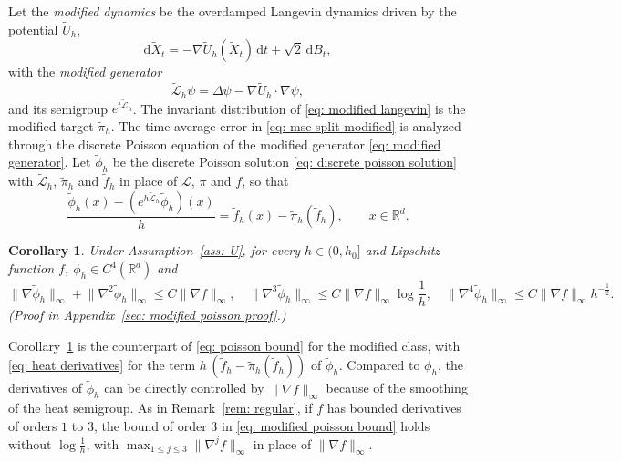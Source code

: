 \documentclass{article}
\newtheorem{corollary}{Corollary}
\newcommand{\Le}{\leqslant}
\newcommand{\D}{\mathrm{d}}
\newcommand{\norm}[1]{\lVert #1 \rVert}
\numberwithin{equation}{section}
\begin{document}
Let the \emph{modified dynamics} be the overdamped Langevin dynamics driven by the potential $\tilde U_h$,
\begin{equation}
    \D \tilde X_t = -\nabla \tilde U_h(\tilde X_t)\,\D t + \sqrt2\,\D B_t ,
    \label{eq: modified langevin}
\end{equation}
with the \emph{modified generator}
\begin{equation}
    \tilde{\mathcal L}_h \psi = \Delta \psi - \nabla \tilde U_h \cdot \nabla \psi ,
    \label{eq: modified generator}
\end{equation}
and its semigroup $e^{t\tilde{\mathcal L}_h}$. The invariant distribution of \eqref{eq: modified langevin} is the modified target $\tilde\pi_h$. The time average error in \eqref{eq: mse split modified} is analyzed through the discrete Poisson equation of the modified generator \eqref{eq: modified generator}. Let $\tilde\phi_h$ be the discrete Poisson solution \eqref{eq: discrete poisson solution} with $\tilde{\mathcal L}_h$, $\tilde\pi_h$ and $\tilde f_h$ in place of $\mathcal L$, $\pi$ and $f$, so that
\begin{equation}
    \frac{\tilde\phi_h(x) - (e^{h\tilde{\mathcal L}_h} \tilde\phi_h)(x)}{h} = \tilde f_h(x) - \tilde\pi_h(\tilde f_h) , \qquad x \in \mathbb R^d .
    \label{eq: modified poisson}
\end{equation}

\begin{corollary}
\label{cor: modified poisson}
    Under Assumption~\ref{ass: U}, for every $h \in (0,h_0]$ and Lipschitz function $f$, $\tilde\phi_h \in C^4(\mathbb R^d)$ and
    \begin{equation}
        \norm{\nabla \tilde\phi_h}_\infty + \norm{\nabla^2 \tilde\phi_h}_\infty \Le C \norm{\nabla f}_\infty  , \quad
        \norm{\nabla^3 \tilde\phi_h}_\infty \Le C \norm{\nabla f}_\infty \log\frac1h , \quad
        \norm{\nabla^4 \tilde\phi_h}_\infty \Le C \norm{\nabla f}_\infty h^{-\frac12} .
        \label{eq: modified poisson bound}
    \end{equation}
    \emph{(Proof in Appendix~\ref{sec: modified poisson proof}.)}
\end{corollary}

Corollary~\ref{cor: modified poisson} is the counterpart of \eqref{eq: poisson bound} for the modified class, with \eqref{eq: heat derivatives} for the term $h\, ( \tilde f_h - \tilde\pi_h(\tilde f_h) )$ of $\tilde\phi_h$. Compared to $\phi_h$, the derivatives of $\tilde\phi_h$ can be directly controlled by $\norm{\nabla f}_\infty$ because of the smoothing of the heat semigroup. As in Remark~\ref{rem: regular}, if $f$ has bounded derivatives of orders $1$ to $3$, the bound of order $3$ in \eqref{eq: modified poisson bound} holds without $\log\frac1h$, with $\max_{1 \Le j \Le 3} \norm{\nabla^j f}_\infty$ in place of $\norm{\nabla f}_\infty$.
\end{document}
